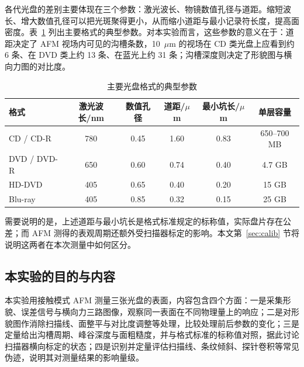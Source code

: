 各代光盘的差别主要体现在三个参数：激光波长、物镜数值孔径与道距。缩短波长、增大数值孔径可以把光斑聚得更小，从而缩小道距与最小记录符长度，提高面密度。表~\ref{tab:format} 列出主要格式的典型参数。对本实验而言，这些参数的意义在于：道距决定了 AFM 视场内可见的沟槽条数，10~$\mu$m 的视场在 CD 类光盘上应看到约 6 条、在 DVD 类上约 13 条、在蓝光上约 31 条；沟槽深度则决定了形貌图与横向力图的对比度。

\begin{table}[H]
\centering
\caption{主要光盘格式的典型参数}
\label{tab:format}
\small
{}
\begin{tabular}{@{}lccccc@{}}
\toprule
格式 & 激光波长/nm & 数值孔径 & 道距/$\mu$m & 最小坑长/$\mu$m & 单层容量 \\
\midrule
CD / CD-R & 780 & 0.45 & 1.60 & 0.83 & 650--700 MB \\
DVD / DVD-R & 650 & 0.60 & 0.74 & 0.40 & 4.7 GB \\
HD-DVD & 405 & 0.65 & 0.40 & 0.20 & 15 GB \\
Blu-ray & 405 & 0.85 & 0.32 & 0.15 & 25 GB \\
\bottomrule
\end{tabular}
\end{table}

需要说明的是，上述道距与最小坑长是格式标准规定的标称值，实际盘片存在公差；而 AFM 测得的表观周期还额外受扫描器标定的影响。本文第~\ref{sec:calib} 节将说明这两者在本次测量中如何区分。

\subsection{本实验的目的与内容}

本实验用接触模式 AFM 测量三张光盘的表面，内容包含四个方面：一是采集形貌、误差信号与横向力三路图像，观察同一表面在不同物理量上的响应；二是对形貌图作消除扫描线、面整平与对比度调整等处理，比较处理前后参数的变化；三是定量给出沟槽周期、峰谷深度与面粗糙度，并与格式标准的标称值对照，据此讨论扫描器横向标定的状态；四是识别并定量评估扫描线、条纹倾斜、探针卷积等常见伪迹，说明其对测量结果的影响量级。

